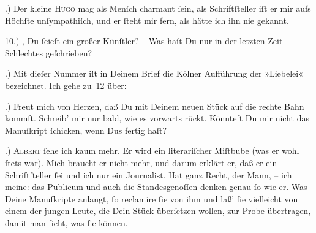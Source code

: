 .) Der kleine \textsc{Hugo} mag als Menſch charmant ſein, als Schriftſteller iſt er mir aufs Höchſte
               unſympathiſch, und er ſteht mir fern, als hätte ich ihn nie gekannt.\pend
           
\pstart
           {\pb}10.) \label{K_L02774-7v}\label{K_L02774-7}, Du ſeieſt ein großer Künſtler? – Was haſt Du nur in der letzten Zeit
               Schlechtes geſchrieben?\pend
           
.) Mit dieſer  Nummer iſt in Deinem Brief die Kölner
               Aufführung der »Liebelei« bezeichnet. Ich gehe
               zu 12 über:\pend
           
.) Freut mich von Herzen, daß Du mit Deinem neuen Stück auf die rechte Bahn kommſt. Schreib’ mir nur bald, wie
                   es vorwarts rückt. Könnteſt {\pb}Du mir nicht das Manuſkript ſchicken, wenn Dus fertig haſt?\pend
           
.) \textsc{Albert} ſehe ich kaum mehr. Er wird ein literariſcher Miſtbube (was er wohl ſtets war).
               Mich braucht er nicht mehr, und darum erklärt er, daß er ein Schriftſteller ſei und ich nur ein Journalist. Hat
               ganz Recht, der Mann, – ich
               meine: das Publicum und auch die Standesgenoſſen denken genau ſo wie er. Was {\pb}Deine Manuſkripte anlangt, ſo reclamire ſie von ihm
               und laß’ ſie vielleicht von einem der jungen Leute, die Dein Stück überſetzen
               wollen, zur \uline{Probe} übertragen,  damit man ſieht, was ſie können.\pend
           
